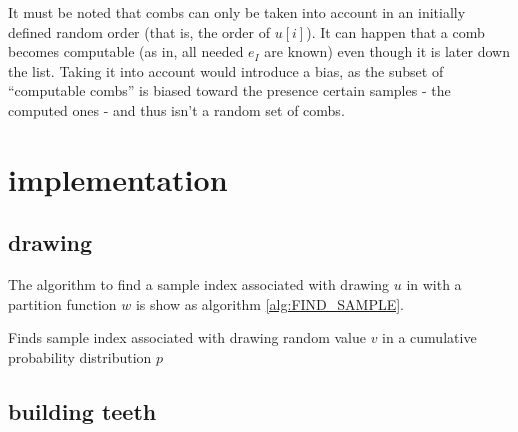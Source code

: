 \documentclass[./thesis.tex]{subfiles}
\begin{document}
It must be noted that combs can only be taken into account in an initially defined random order (that is, the order of $u[i]$).
It can happen that a comb becomes computable (as in, all needed $e_I$ are known) even though it is later down the list. Taking it into account would introduce a bias, as the subset of ``computable combs'' is biased toward the presence certain samples - the computed ones - and thus isn't a random set of combs.


\section{implementation}


\subsection{drawing}

The algorithm to find a sample index associated with drawing $u$ in with a partition function $w$ is show as algorithm \ref{alg:FIND_SAMPLE}.

\begin{algorithm}
\label{alg:FIND_SAMPLE}
\caption[FIND\_SAMPLE]{Finds sample index associated with drawing random value $v$ in a cumulative probability distribution $p$}

	
	
\end{algorithm}




\subsection{building teeth}
\end{document}

